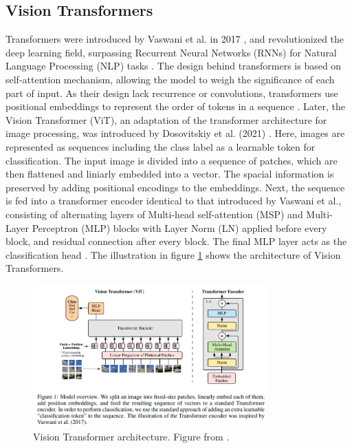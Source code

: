 
\subsection{Vision Transformers}
\label{sec:ViTs}

Transformers were introduced by Vaswani et al. in 2017 \cite{vaswani2023attentionneed}, and revolutionized the deep learning field, surpassing Recurrent Neural Networks (RNNs) for Natural Language Processing (NLP) tasks  \cite{v7labs-vit,vaswani2023attentionneed}. The design behind transformers is based on self-attention mechanism, allowing the model to weigh the significance of each part of input. As their design lack recurrence or convolutions, transformers use positional embeddings to represent the order of tokens in a sequence \cite{vaswani2023attentionneed}. Later, the Vision Transformer (ViT), an adaptation of the transformer architecture for image processing, was introduced by Dosovitskiy et al. (2021) \cite{dosovitskiy2021imageworth16x16words}. Here, images are represented as sequences including the class label as a learnable token for classification. The input image is divided into a sequence of patches, which are then flattened and liniarly embedded into a vector. The spacial information is preserved by adding positional encodings to the embeddings. Next, the sequence is fed into a transformer encoder identical to that introduced by Vaswani et al., consisting of alternating layers of Multi-head self-attention (MSP) and Multi-Layer Perceptron (MLP) blocks with Layer Norm (LN) applied before every block, and residual connection after every block. The final MLP layer acts as the classification head \cite{dosovitskiy2021imageworth16x16words}. The illustration in figure \ref{fig:vit_arch} shows the architecture of Vision Transformers.

\begin{figure}[h!]
    \centering
    \includegraphics[width=0.8\textwidth]{Images/vit.png} 
    \caption{Vision Transformer architecture. Figure from \cite{dosovitskiy2021imageworth16x16words}. }
    \label{fig:vit_arch}
\end{figure}

